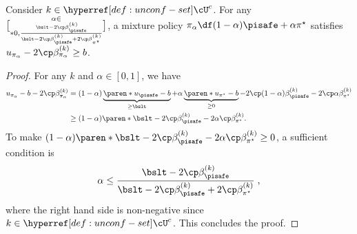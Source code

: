 \begin{lemma}\label{lemma:alpha-feasibility}
Consider $k \in \unconfBandit^c$.
For any $\alpha \in \brack*{0,  \frac{\bslt - 2\cp \beta^{(k)}_{\pisafe}}{\bslt - 2\cp \beta^{(k)}_{\pisafe} + 2\cp \beta^{(k)}_{\pi^\star}}}$, a mixture policy \(\pi_\alpha \df (1-\alpha) \pisafe + \alpha \pi^\star\) satisfies
$u_{\pi_\alpha} - 2\cp \beta^{(k)}_{\pi_\alpha} \geq b$.
\end{lemma}
\begin{proof}
For any $k$ and $\alpha \in [0, 1]$, we have
\begin{align*}
u_{\pi_\alpha} - b - 2\cp \beta^{(k)}_{\pi_\alpha}
&= (1-\alpha) \underbrace{\paren*{u_{\pisafe} - b}}_{\geq \bslt} + \alpha \underbrace{\paren*{u_{\pi^\star} - b}}_{\geq 0} - 2\cp (1-\alpha) \beta^{(k)}_{\pisafe} - 2\cp \alpha \beta^{(k)}_{\pi^\star}\\
&\geq (1-\alpha) \paren*{\bslt - 2\cp \beta^{(k)}_{\pisafe}} - 2\alpha \cp \beta^{(k)}_{\pi^\star}.
\end{align*}
To make \((1-\alpha) \paren*{\bslt- 2\cp \beta^{(k)}_{\pisafe}} - 2\alpha \cp \beta^{(k)}_{\pi^\star} \geq 0\), a sufficient condition is
\begin{align}\label{eq:alpha-cond-temp}
   \alpha \leq  \frac{\bslt - 2\cp \beta^{(k)}_{\pisafe}}{\bslt - 2\cp \beta^{(k)}_{\pisafe} + 2\cp \beta^{(k)}_{\pi^\star}}\;,
\end{align}
where the right hand side is non-negative since $k \in \unconfBandit^c$.
This concludes the proof.
\end{proof}


